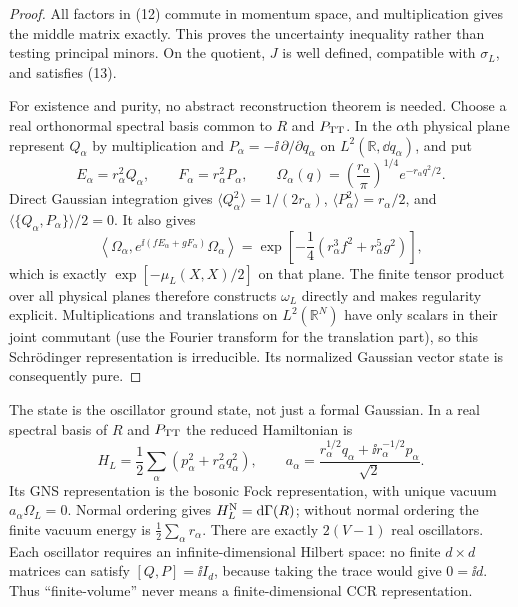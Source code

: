 \begin{proof}
All factors in (12) commute in momentum space, and multiplication gives the
middle matrix exactly.  This proves the uncertainty inequality rather than testing principal
minors.  On the quotient, $J$ is well defined, compatible with $\sigma_L$,
and satisfies (13).

For existence and purity, no abstract reconstruction theorem is needed.
Choose a real orthonormal spectral basis common to $R$ and $P_{\mathrm{TT}}$.  In the
$\alpha$th physical plane represent $Q_\alpha$ by multiplication and
$P_\alpha=-\ii\,\partial/\partial q_\alpha$ on
$L^2(\mathbb R,\dd q_\alpha)$, and put
\[
 E_\alpha=r_\alpha^2Q_\alpha,\qquad
 F_\alpha=r_\alpha^2P_\alpha,\qquad
 \Omega_\alpha(q)=
 \left(\frac{r_\alpha}{\pi}\right)^{1/4}
 e^{-r_\alpha q^2/2}.                              \tag{13a}
\]
Direct Gaussian integration gives
$\langle Q_\alpha^2\rangle=1/(2r_\alpha)$,
$\langle P_\alpha^2\rangle=r_\alpha/2$, and
$\langle\{Q_\alpha,P_\alpha\}\rangle/2=0$.  It also gives
\[
 \left\langle\Omega_\alpha,
 e^{\ii(fE_\alpha+gF_\alpha)}\Omega_\alpha\right\rangle
 =\exp\!\left[-\frac14
   \left(r_\alpha^3f^2+r_\alpha^5g^2\right)\right],
                                                               \tag{13b}
\]
which is exactly $\exp[-\mu_L(X,X)/2]$ on that plane.  The finite tensor
product over all physical planes therefore constructs $\omega_L$ directly
and makes regularity explicit.  Multiplications and translations on
$L^2(\mathbb R^N)$ have only scalars in their joint commutant (use the Fourier
transform for the translation part), so this Schr\"odinger representation is
irreducible.  Its normalized Gaussian vector state is consequently pure.
\end{proof}

The state is the oscillator ground state, not just a formal Gaussian.  In a
real spectral basis of $R$ and $P_{\mathrm{TT}}$ the reduced Hamiltonian is
\[
 H_L=\frac12\sum_\alpha(p_\alpha^2+r_\alpha^2q_\alpha^2),\qquad
 a_\alpha=\frac{r_\alpha^{1/2}q_\alpha+\ii r_\alpha^{-1/2}p_\alpha}{\sqrt2}.
                                                               \tag{14}
\]
Its GNS representation is the bosonic Fock representation, with unique vacuum
$a_\alpha\Omega_L=0$.  Normal ordering gives
$H_L^{\rm N}=\mathrm{d}\Gamma(R)$; without normal ordering the finite vacuum energy
is $\frac12\sum_\alpha r_\alpha$.  There are exactly $2(V-1)$ real
oscillators.  Each oscillator requires an infinite-dimensional Hilbert space:
no finite $d\times d$ matrices can satisfy $[Q,P]=\ii I_d$, because taking the
trace would give $0=\ii d$.  Thus ``finite-volume'' never means a
finite-dimensional CCR representation.

